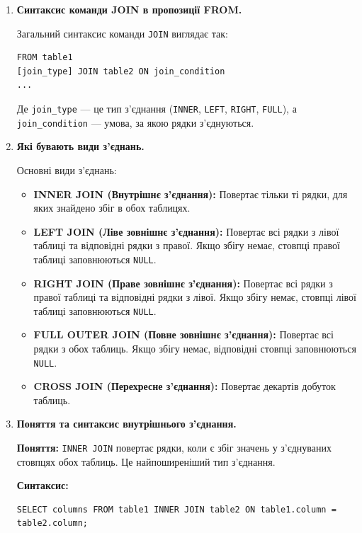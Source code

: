 \documentclass{article}
\begin{document}
\begin{enumerate}[label=\arabic*., leftmargin=*]
        \item \textbf{Синтаксис команди JOIN в пропозиції FROM.}
        
        Загальний синтаксис команди \texttt{JOIN} виглядає так:
        \begin{CodeBox}
        \begin{verbatim}
FROM table1
[join_type] JOIN table2 ON join_condition
...
        \end{verbatim}
        \end{CodeBox}
        Де \texttt{join\_type} — це тип з'єднання (\texttt{INNER}, \texttt{LEFT}, \texttt{RIGHT}, \texttt{FULL}), а \texttt{join\_condition} — умова, за якою рядки з'єднуються.

        \item \textbf{Які бувають види з’єднань.}
        
        Основні види з'єднань:
        \begin{itemize}
            \item \textbf{INNER JOIN (Внутрішнє з'єднання):} Повертає тільки ті рядки, для яких знайдено збіг в обох таблицях.
            \item \textbf{LEFT JOIN (Ліве зовнішнє з'єднання):} Повертає всі рядки з лівої таблиці та відповідні рядки з правої. Якщо збігу немає, стовпці правої таблиці заповнюються \texttt{NULL}.
            \item \textbf{RIGHT JOIN (Праве зовнішнє з'єднання):} Повертає всі рядки з правої таблиці та відповідні рядки з лівої. Якщо збігу немає, стовпці лівої таблиці заповнюються \texttt{NULL}.
            \item \textbf{FULL OUTER JOIN (Повне зовнішнє з'єднання):} Повертає всі рядки з обох таблиць. Якщо збігу немає, відповідні стовпці заповнюються \texttt{NULL}.
            \item \textbf{CROSS JOIN (Перехресне з'єднання):} Повертає декартів добуток таблиць.
        \end{itemize}

        \item \textbf{Поняття та синтаксис внутрішнього з’єднання.}
        
        \textbf{Поняття:} \texttt{INNER JOIN} повертає рядки, коли є збіг значень у з'єднуваних стовпцях обох таблиць. Це найпоширеніший тип з'єднання.
        
        \textbf{Синтаксис:}
        \begin{CodeBox}
        \begin{verbatim}
SELECT columns FROM table1 INNER JOIN table2 ON table1.column = table2.column;
        \end{verbatim}
        \end{CodeBox}
        

\end{enumerate}
\end{document}
